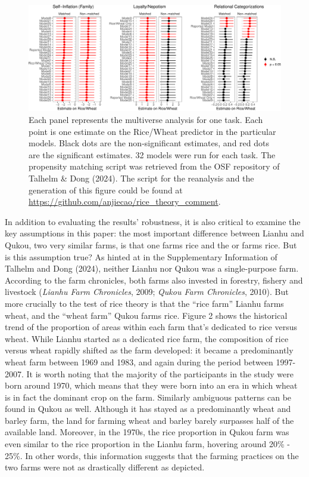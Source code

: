 \documentclass[
  man]{apa6}
\begin{document}
\begin{figure}
\centering
\includegraphics{comment_files/figure-latex/unnamed-chunk-1-1.pdf}
\caption{\label{fig:unnamed-chunk-1} Each panel represents the multiverse analysis for one task. Each point is one estimate on the Rice/Wheat predictor in the particular models. Black dots are the non-significant estimates, and red dots are the significant estimates. 32 models were run for each task. The propensity matching script was retrieved from the OSF repository of Talhelm \& Dong (2024). The script for the reanalysis and the generation of this figure could be found at \url{https://github.com/anjiecao/rice_theory_comment}.}
\end{figure}

In addition to evaluating the results' robustness, it is also critical to examine the key assumptions in this paper: the most important difference between Lianhu and Qukou, two very similar farms, is that one farms rice and the or farms rice. But is this assumption true? As hinted at in the Supplementary Information of Talhelm and Dong (2024), neither Lianhu nor Qukou was a single-purpose farm. According to the farm chronicles, both farms also invested in forestry, fishery and livestock (\emph{Lianhu Farm Chronicles}, 2009; \emph{Qukou Farm Chronicles}, 2010). But more crucially to the test of rice theory is that the ``rice farm'' Lianhu farms wheat, and the ``wheat farm'' Qukou farms rice. Figure 2 shows the historical trend of the proportion of areas within each farm that's dedicated to rice versus wheat. While Lianhu started as a dedicated rice farm, the composition of rice versus wheat rapidly shifted as the farm developed: it became a predominantly wheat farm between 1969 and 1983, and again during the period between 1997-2007. It is worth noting that the majority of the participants in the study were born around 1970, which means that they were born into an era in which wheat is in fact the dominant crop on the farm. Similarly ambiguous patterns can be found in Qukou as well. Although it has stayed as a predominantly wheat and barley farm, the land for farming wheat and barley barely surpasses half of the available land. Moreover, in the 1970s, the rice proportion in Qukou farm was even similar to the rice proportion in the Lianhu farm, hovering around 20\% - 25\%. In other words, this information suggests that the farming practices on the two farms were not as drastically different as depicted.
\end{document}
